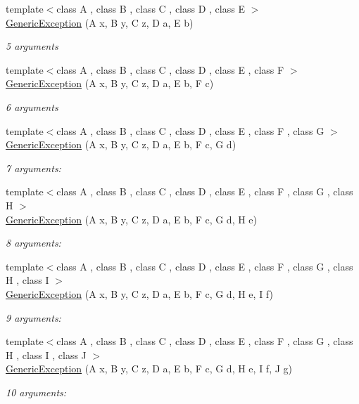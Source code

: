 \begin{DoxyCompactItemize}
{\footnotesize template$<$class A , class B , class C , class D , class E $>$ }\\\hyperlink{classGenericException_a873e816a83f751d79b527cfc91224946}{Generic\+Exception} (A x, B y, C z, D a, E b)
\begin{DoxyCompactList}\small\item\em 5 arguments \end{DoxyCompactList}\item 
{\footnotesize template$<$class A , class B , class C , class D , class E , class F $>$ }\\\hyperlink{classGenericException_af68703d73dded955ed84972ac86cb292}{Generic\+Exception} (A x, B y, C z, D a, E b, F c)
\begin{DoxyCompactList}\small\item\em 6 arguments \end{DoxyCompactList}\item 
{\footnotesize template$<$class A , class B , class C , class D , class E , class F , class G $>$ }\\\hyperlink{classGenericException_a0d50da47c2103e306fab8c7976961954}{Generic\+Exception} (A x, B y, C z, D a, E b, F c, G d)
\begin{DoxyCompactList}\small\item\em 7 arguments\+: \end{DoxyCompactList}\item 
{\footnotesize template$<$class A , class B , class C , class D , class E , class F , class G , class H $>$ }\\\hyperlink{classGenericException_a59fefdaacf2b5d0f094340e5855d8ee4}{Generic\+Exception} (A x, B y, C z, D a, E b, F c, G d, H e)
\begin{DoxyCompactList}\small\item\em 8 arguments\+: \end{DoxyCompactList}\item 
{\footnotesize template$<$class A , class B , class C , class D , class E , class F , class G , class H , class I $>$ }\\\hyperlink{classGenericException_aaaa9839b8f6bf4760c9b48349e68e27a}{Generic\+Exception} (A x, B y, C z, D a, E b, F c, G d, H e, I f)
\begin{DoxyCompactList}\small\item\em 9 arguments\+: \end{DoxyCompactList}\item 
{\footnotesize template$<$class A , class B , class C , class D , class E , class F , class G , class H , class I , class J $>$ }\\\hyperlink{classGenericException_a040d7939f50745cba15a6eba865698e5}{Generic\+Exception} (A x, B y, C z, D a, E b, F c, G d, H e, I f, J g)
\begin{DoxyCompactList}\small\item\em 10 arguments\+: \end{DoxyCompactList}\end{DoxyCompactItemize}


